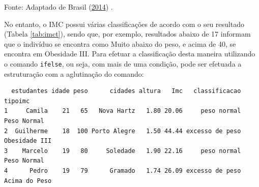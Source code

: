 \documentclass[12pt,brazil,oneside]{book}
\newenvironment{Shaded}{\begin{snugshade}}{\end{snugshade}}
\newcommand{\DecValTok}[1]{\textcolor[rgb]{0.00,0.00,0.81}{#1}}
\newcommand{\FloatTok}[1]{\textcolor[rgb]{0.00,0.00,0.81}{#1}}
\newcommand{\KeywordTok}[1]{\textcolor[rgb]{0.13,0.29,0.53}{\textbf{#1}}}
\newcommand{\NormalTok}[1]{#1}
\newcommand{\OperatorTok}[1]{\textcolor[rgb]{0.81,0.36,0.00}{\textbf{#1}}}
\newcommand{\StringTok}[1]{\textcolor[rgb]{0.31,0.60,0.02}{#1}}
\begin{document}
Fonte: Adaptado de Brasil (\protect\hyperlink{ref-brasil2014}{2014}) .

No entanto, o IMC possui várias classificações de acordo com o seu resultado (Tabela \ref{tab:imct}), sendo que, por exemplo, resultados abaixo de 17 informam que o indivíduo se encontra como Muito abaixo do peso, e acima de 40, se encontra em Obesidade III. Para efetuar a classificação desta maneira utilizando o comando \texttt{ifelse}, ou seja, com mais de uma condição, pode ser efetuada a estruturação com a aglutinação do comando:

\begin{Shaded}
\end{Shaded}

\begin{verbatim}
  estudantes idade peso      cidades altura   Imc   classificacao       tipoimc
1     Camila    21   65   Nova Hartz   1.80 20.06     peso normal   Peso Normal
2  Guilherme    18  100 Porto Alegre   1.50 44.44 excesso de peso Obesidade III
3    Marcelo    19   80     Soledade   1.90 22.16     peso normal   Peso Normal
4      Pedro    19   79      Gramado   1.74 26.09 excesso de peso Acima do Peso
\end{verbatim}
\end{document}
